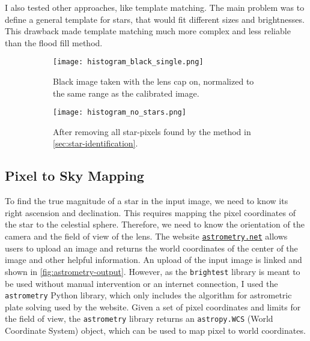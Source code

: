 I also tested other approaches, like template matching. The main problem was to define a
general template for stars, that would fit different sizes and brightnesses. This drawback
made template matching much more complex and less reliable than the flood fill method.

\begin{figure}[tb]
  \centering
  \begin{subfigure}{.49\textwidth}
    \centering
    \texttt{[image: histogram\_black\_single.png]}
    \caption{Black image taken with the lens cap on, normalized to the same range as the calibrated image.}
    \label{fig:black-histogram}
  \end{subfigure}%
  \hfill
  \begin{subfigure}{.49\textwidth}
    \centering
    \texttt{[image: histogram\_no\_stars.png]}
    \caption{After removing all star-pixels found by the method in \autoref{sec:star-identification}.}
    \label{fig:after-removing-stars}
  \end{subfigure}
  \caption{}
  \label{fig:removing-stars}
\end{figure}

\subsection{Pixel to Sky Mapping}
\label{sec:pixel-to-sky-mapping}

To find the true magnitude of a star in the input image, we need to know its right
ascension and declination. This requires mapping the pixel coordinates of the star to the
celestial sphere. Therefore, we need to know the orientation of the camera and the field
of view of the lens. The website
\href{https://nova.astrometry.net}{\texttt{astrometry.net}} \cite{astrometry2010} allows
users to upload an image and returns the world coordinates of the center of the image and
other helpful information. An upload of the input image is linked and shown in
\autoref{fig:astrometry-output}. However, as the \texttt{brightest} library is meant to be
used without manual intervention or an internet connection, I used the \texttt{astrometry}
Python library, which only includes the algorithm for astrometric plate solving used by
the website. Given a set of pixel coordinates and limits for the field of view, the
\texttt{astrometry} library returns an \texttt{astropy.WCS} (World Coordinate System)
object, which can be used to map pixel to world coordinates.

